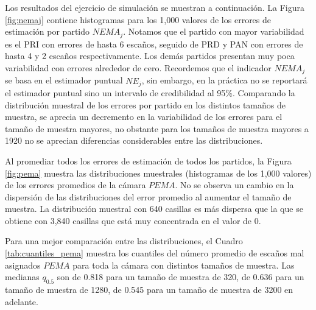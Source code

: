 \documentclass[]{article}
\begin{document}
Los resultados del ejercicio de simulación se muestran a continuación. La Figura \ref{fig:nemaj} contiene histogramas para los 1,000 valores de los errores de estimación por partido $NEMA_j$. Notamos que el partido con mayor variabilidad es el PRI con errores de hasta 6 escaños, seguido de PRD y PAN con errores de hasta 4 y 2 escaños respectivamente. Los demás partidos presentan muy poca variabilidad con errores alrededor de cero. Recordemos que el indicador $NEMA_j$ se basa en el estimador puntual $\widehat{NE}_j$, sin embargo, en la práctica no se reportará el estimador puntual sino un intervalo de credibilidad al 95\%. Comparando la distribución muestral de los errores por partido en los distintos tamaños de muestra, se aprecia un decremento en la variabilidad de los errores para el tamaño de muestra mayores, no obstante para los tamaños de muestra mayores a 1920 no se aprecian diferencias considerables entre las distribuciones.


Al promediar todos los errores de estimación de todos los partidos, la Figura \ref{fig:pema} muestra las distribuciones muestrales (histogramas de los 1,000 valores) de los errores promedios de la cámara $PEMA$. No se observa un cambio en la dispersión de las distribuciones del error promedio al aumentar el tamaño de muestra. La distribución muestral con 640 casillas es más dispersa que la que se obtiene con 3,840 casillas que está muy concentrada en el valor de 0. 


Para una mejor comparación entre las distribuciones, el Cuadro \ref{tab:cuantiles_pema} muestra los cuantiles del número promedio de escaños mal asignados $PEMA$ para toda la cámara con distintos tamaños de muestra. Las medianas $q_{0.5}$ son de 0.818 para un tamaño de muestra de 320, de 0.636 para un tamaño de muestra de 1280, de 0.545 para un tamaño de muestra de 3200 en adelante. 
\end{document}

